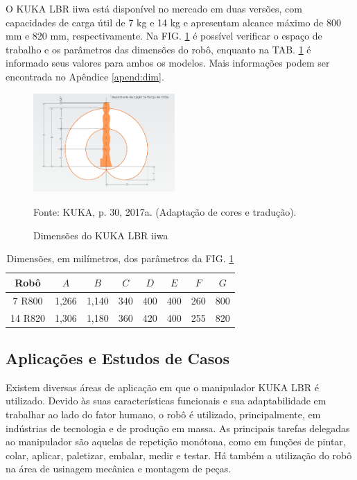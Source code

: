 O KUKA LBR iiwa está disponível no mercado em duas versões, com capacidades de carga útil de 7 kg e 14 kg e apresentam alcance máximo de 800 mm e 820 mm, respectivamente. Na FIG. \ref{fig:dimensoes} é possível verificar o espaço de trabalho e os parâmetros das dimensões do robô, enquanto na TAB. \ref{tab:dimensoes} é informado seus valores para ambos os modelos. Mais informações podem ser encontrada no Apêndice \ref{apend:dim}.

\begin{figure}[h]
    \centering
    \includegraphics[width=0.48\textwidth]{Imagem/volume_trab.eps}
    \caption{Dimensões do KUKA LBR iiwa}
    \label{fig:dimensoes}
    \begin{flushleft}
    Fonte: KUKA, p. 30, 2017a. (Adaptação de     cores e tradução).
    \end{flushleft}
\end{figure}

\begin{table}[h]
    \centering
    \caption{Dimensões, em milímetros, dos parâmetros da FIG. \ref{fig:dimensoes}}
    \label{tab:dimensoes}
    \begin{tabular}{cccccccc}
    \toprule
        Robô & $A$ & $B$ & $C$ & $D$ & $E$ & $F$ & $G$ \\
    \midrule
         7 R800 & 1,266 & 1,140 & 340 & 400 & 400 & 260 & 800 \\
        14 R820 & 1,306 & 1,180 & 360 & 420 & 400 & 255 & 820 \\
    \bottomrule
    \end{tabular}
\end{table}

\subsection{Aplicações e Estudos de Casos}

Existem diversas áreas de aplicação em que o manipulador KUKA LBR é utilizado. Devido às suas características funcionais e sua adaptabilidade em trabalhar ao lado do fator humano, o robô é utilizado, principalmente, em indústrias de tecnologia e de produção em massa. As principais tarefas delegadas ao manipulador são aquelas de repetição monótona, como em funções de pintar, colar, aplicar, paletizar, embalar, medir e testar. Há também a utilização do robô na área de usinagem mecânica e montagem de peças.

